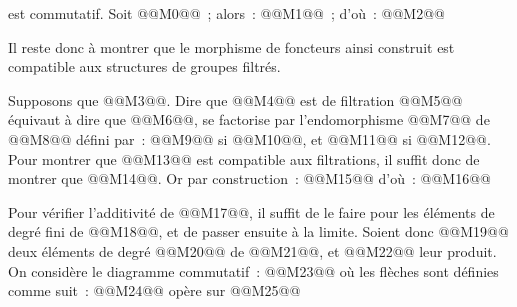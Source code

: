 
est
commutatif. Soit @@M0@@~; alors~: @@M1@@~; d'où~:
@@M2@@

Il reste donc à montrer que le morphisme de foncteurs ainsi construit est compatible aux structures de groupes filtrés.

Supposons que @@M3@@. Dire que @@M4@@ est de filtration @@M5@@ équivaut à dire que @@M6@@, se factorise par l'endomorphisme @@M7@@ de @@M8@@ défini par~: @@M9@@ si @@M10@@, et @@M11@@ si @@M12@@.
Pour montrer que @@M13@@ est compatible aux filtrations, il suffit donc de montrer que @@M14@@. Or par construction~:
@@M15@@
d'où~:
@@M16@@

Pour vérifier l'additivité de @@M17@@, il suffit de le faire pour les éléments de degré fini de @@M18@@, et de passer ensuite à la limite. Soient donc @@M19@@ deux éléments de degré @@M20@@ de @@M21@@, et @@M22@@ leur produit. On considère le diagramme commutatif~:
@@M23@@
où les flèches sont définies comme suit~: @@M24@@ opère sur @@M25@@ 
